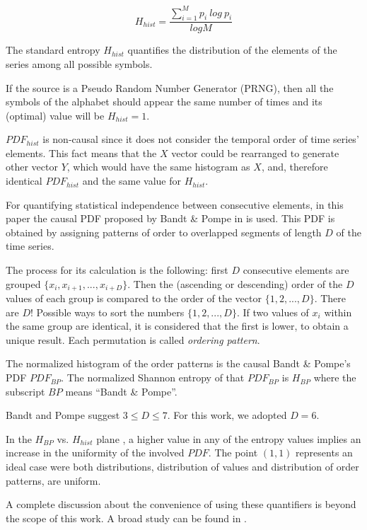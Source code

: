 \begin{equation}
\label{eq:entropia}
H_{hist}=\frac{\sum_{i=1}^{M}{p_i~log~p_i}}{logM}
\end{equation}

The standard entropy $H_{hist}$ quantifies the distribution of the elements of the series among all possible symbols.

If the source is a Pseudo Random Number Generator (PRNG), then all the symbols of the alphabet should appear the same number of times and its (optimal) value will be $H_{hist}=1$.

$PDF_{hist}$ is non-causal since it does not consider the temporal order of  time series' elements. This fact means that the $X$ vector could be rearranged to generate other vector $Y$, which would have the same histogram as $X$, and, therefore identical $PDF_{hist}$ and the same value for $H_{hist}$.

For quantifying statistical independence between consecutive elements, in this paper the causal PDF proposed by Bandt \& Pompe in \cite{Pompe2002} is used.
This PDF is obtained by assigning patterns of order to overlapped segments of length $D$ of the time series.

The process for its calculation is the following: first $D$ consecutive elements are grouped $\{x_i,x_{i+1},...,x_{i+D}\}$. Then the (ascending or descending) order of the $D$ values of each group is compared to the order of the vector $\{1,2,...,D\}$. There are $D!$ Possible ways to sort the numbers  $\{1,2,...,D\}$. If two values of $x_i$ within the same group are identical, it is considered that the first is lower, to obtain a unique result. Each permutation is called \emph{ordering pattern}\cite{Amigo2006}. 

The normalized histogram of the order patterns is the causal Bandt \& Pompe's PDF $PDF_{BP}$. The normalized Shannon entropy of that $PDF_{BP}$ is $H_{BP}$ where the subscript $BP$ means ``Bandt \& Pompe''.

Bandt and Pompe suggest $3\leq D \leq7$. For this work, we adopted $D=6$.

In the $H_{BP}$ vs. $H_{hist}$ plane \cite{DeMicco2008}, a higher value in any of the entropy values implies an increase in the uniformity of the involved $PDF$. The point $(1,1)$ represents an ideal case were both distributions, distribution of values and distribution of order patterns, are uniform.

A complete discussion about the convenience of using these quantifiers is beyond the scope of this work. A broad study can be found in \cite{DeMicco2008,Wackerbauer1994,Lopez1995,Rosso2007A,Rosso2009}.

